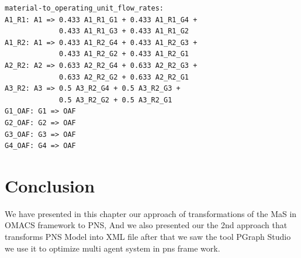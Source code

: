 \begin{lstlisting}[caption=Part from Graph.in]
material-to_operating_unit_flow_rates:
A1_R1: A1 => 0.433 A1_R1_G1 + 0.433 A1_R1_G4 +
			 0.433 A1_R1_G3 + 0.433 A1_R1_G2
A1_R2: A1 => 0.433 A1_R2_G4 + 0.433 A1_R2_G3 + 
			 0.433 A1_R2_G2 + 0.433 A1_R2_G1
A2_R2: A2 => 0.633 A2_R2_G4 + 0.633 A2_R2_G3 + 
			 0.633 A2_R2_G2 + 0.633 A2_R2_G1
A3_R2: A3 => 0.5 A3_R2_G4 + 0.5 A3_R2_G3 + 
			 0.5 A3_R2_G2 + 0.5 A3_R2_G1
G1_OAF: G1 => OAF
G2_OAF: G2 => OAF
G3_OAF: G3 => OAF
G4_OAF: G4 => OAF

\end{lstlisting}


\section{Conclusion}
We have presented in this chapter  our approach of transformations of the MaS in OMACS framework to PNS, And we also presented our the 2nd
approach that transforms PNS Model into XML file after that we saw the tool PGraph Studio we use it to optimize multi agent system in pns frame work.

